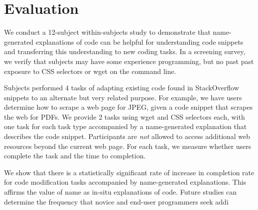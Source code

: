 \section{Evaluation}

We conduct a 12-subject within-subjects study to demonstrate that \gls{name}-generated explanations of code can be helpful for understanding code snippets and transferring this understanding to new coding tasks.
In a screening survey, we verify that subjects may have some experience programming, but no past past exposure to CSS selectors or wget on the command line.

Subjects performed 4 tasks of adapting existing code found in StackOverflow snippets to an alternate but very related purpose.
For example, we have users determine how to scrape a web page for JPEG, given a code snippet that scrapes the web for PDFs.
We provide 2 tasks using wget and CSS selectors each, with one task for each task type accompanied by a \gls{name}-generated explanation that describes the code snippet.
Participants are \emph{not} allowed to access additional web resources beyond the current web page.
For each task, we measure whether users complete the task and the time to completion. 

We show that there is a statistically significant rate of increase in completion rate for code modification tasks accompanied by \gls{name}-generated explanations.
This affirms the value of \gls{name} as in-situ explanations of code.
Future studies can determine the frequency that novice and end-user programmers seek addi